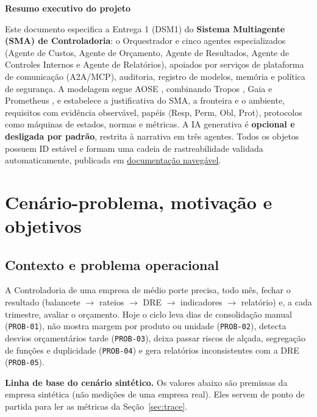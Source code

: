 \documentclass[10pt,a4paper]{article}
\newcommand{\docsURL}{https://fin-dept-multiagents-project.readthedocs.io}
\newenvironment{callout}{\par\addvspace{0.6em}\begingroup}{\endgroup\par\addvspace{0.6em}}
\newcommand{\callouttitle}[1]{{\bfseries #1}\par\vspace{2pt}}
\newcommand{\code}[1]{\texttt{\small #1}}
\begin{document}
\begin{callout}
\callouttitle{Resumo executivo do projeto}
Este documento especifica a Entrega 1 (DSM1) do \textbf{Sistema Multiagente (SMA) de Controladoria}: o
Orquestrador e cinco agentes especializados (Agente de Custos, Agente de Orçamento, Agente de Resultados, Agente de
Controles Internos e Agente de Relatórios), apoiados por serviços de plataforma de comunicação (A2A/MCP),
auditoria, registro de modelos, memória e política de segurança. A modelagem segue AOSE \parencite{cancian2026},
combinando Tropos \parencite{bresciani2004tropos}, Gaia \parencite{wooldridge2000gaia} e Prometheus
\parencite{padgham2004prometheus}, e estabelece a justificativa do SMA, a fronteira e o ambiente,
\nReq{} requisitos com evidência observável, papéis $\langle$Resp, Perm, Obl, Prot$\rangle$, \nProt{} protocolos
como máquinas de estados, \nNorm{} normas e \nMet{} métricas. A IA generativa é \textbf{opcional e desligada por
padrão}, restrita à narrativa em três agentes. Todos os \nObj{} objetos possuem ID estável e formam uma cadeia de
rastreabilidade validada automaticamente, publicada em \href{\docsURL}{documentação navegável}.
\end{callout}


\section{Cenário-problema, motivação e objetivos}

\subsection{Contexto e problema operacional}
A Controladoria de uma empresa de médio porte precisa, todo mês, fechar o resultado
(balancete $\rightarrow$ rateios $\rightarrow$ DRE $\rightarrow$ indicadores $\rightarrow$ relatório) e, a cada
trimestre, avaliar o orçamento. Hoje o ciclo leva dias de consolidação manual (\code{PROB-01}), não mostra margem
por produto ou unidade (\code{PROB-02}), detecta desvios orçamentários tarde (\code{PROB-03}), deixa passar riscos de
alçada, segregação de funções e duplicidade (\code{PROB-04}) e gera relatórios inconsistentes com a DRE
(\code{PROB-05}).

\textbf{Linha de base do cenário sintético.} Os valores abaixo são premissas da empresa sintética (não medições
de uma empresa real). Eles servem de ponto de partida para ler as métricas da Seção~\ref{sec:trace}.
\end{document}
